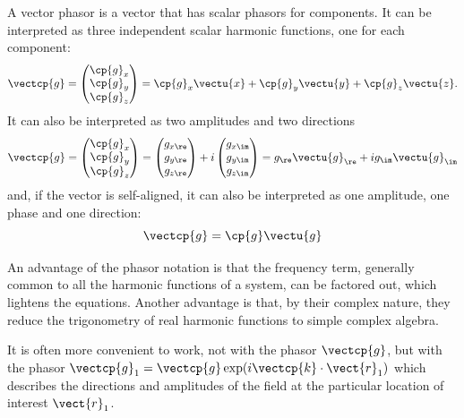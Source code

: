 \begin{refsection}
A vector phasor is a vector that has scalar phasors for components.
It can be interpreted as three independent scalar harmonic functions, one for each component:
\begin{equation}
    \vectcp{g} =
    \begin{pmatrix}
        \cp{g}_x \\ \cp{g}_y \\ \cp{g}_z
    \end{pmatrix}
    =
    \cp{g}_x \vectu{x} + \cp{g}_y \vectu{y} + \cp{g}_z \vectu{z}
    \text{.}
\end{equation}
It can also be interpreted as two amplitudes and two directions
\begin{equation}
    \vectcp{g} =
    \begin{pmatrix}
        \cp{g}_x \\ \cp{g}_y \\ \cp{g}_z
    \end{pmatrix}
    =
    \begin{pmatrix}
        g_{x\re} \\ g_{y\re} \\ g_{z\re}
    \end{pmatrix}
    +
    i
    \begin{pmatrix}
        g_{x\im} \\ g_{y\im} \\ g_{z\im}
    \end{pmatrix}
    =
    g_\re \vectu{g}_\re
    +
    i
    g_\im \vectu{g}_\im
\end{equation}
and, if the vector is self-aligned, it can also be interpreted as one amplitude, one phase and one direction:
\begin{equation}
    \vectcp{g} = \cp{g} \vectu{g}
\end{equation}

An advantage of the phasor notation is that the frequency term, generally common to all the harmonic functions of a system, can be factored out, which lightens the equations.
Another advantage is that, by their complex nature, they reduce the trigonometry of real harmonic functions to simple complex algebra.

It is often more convenient to work, not with the phasor $\vectcp{g}$,
but with the phasor $\vectcp{g}_1 = \vectcp{g} \exp(i \vectcp{k} \cdot \vect{r}_1)$
which describes the directions and amplitudes of the field at the particular location of interest $\vect{r}_1$.


\end{refsection}
